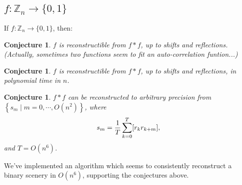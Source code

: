 \documentclass[11pt]{article} \usepackage{amssymb}
\newtheorem{conjecture}[theorem]{Conjecture}
\newcommand{\Z}{\mathbb Z} \newcommand{\CalE}{{\mathcal{E}}}
\begin{document}
\subsection{$f:\Z_n\to\{0,1\}$}
If $f:\Z_n\to\{0,1\}$, then:
\begin{conjecture}
$f$ is reconstructible from $f*f$, up to shifts and reflections. (Actually,
sometimes two functions seem to fit an auto-correlation funtion...)
\end{conjecture}
\begin{conjecture}
$f$ is reconstructible from $f*f$, up to shifts and reflections, 
in polynomial time in $n$.
\end{conjecture}
\begin{conjecture}
$f*f$ can be reconstructed to arbitrary precision from $\left\{s_m\;|\;m=0,\cdots,O(n^2)\right\}$, where
\begin{equation}
   s_m={1\over T}\sum_{k=0}^T[r_kr_{k+m}],
\end{equation}
and $T=O(n^6)$.

\end{conjecture}
We've implemented an algorithm which seems to consistently reconstruct
a binary scenery in $O(n^6)$, supporting the conjectures above.
\end{document}
